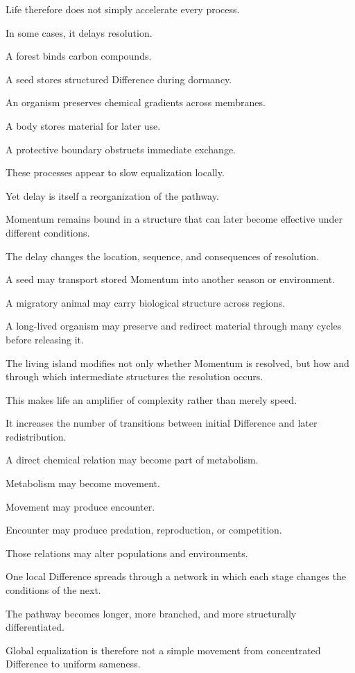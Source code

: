 Life therefore does not simply accelerate every process.

In some cases, it delays resolution.

A forest binds carbon compounds.

A seed stores structured Difference during dormancy.

An organism preserves chemical gradients across membranes.

A body stores material for later use.

A protective boundary obstructs immediate exchange.

These processes appear to slow equalization locally.

Yet delay is itself a reorganization of the pathway.

Momentum remains bound in a structure that can later become effective under different conditions.

The delay changes the location, sequence, and consequences of resolution.

A seed may transport stored Momentum into another season or environment.

A migratory animal may carry biological structure across regions.

A long-lived organism may preserve and redirect material through many cycles before releasing it.

The living island modifies not only whether Momentum is resolved, but how and through which intermediate structures the resolution occurs.

This makes life an amplifier of complexity rather than merely speed.

It increases the number of transitions between initial Difference and later redistribution.

A direct chemical relation may become part of metabolism.

Metabolism may become movement.

Movement may produce encounter.

Encounter may produce predation, reproduction, or competition.

Those relations may alter populations and environments.

One local Difference spreads through a network in which each stage changes the conditions of the next.

The pathway becomes longer, more branched, and more structurally differentiated.

Global equalization is therefore not a simple movement from concentrated Difference to uniform sameness.

